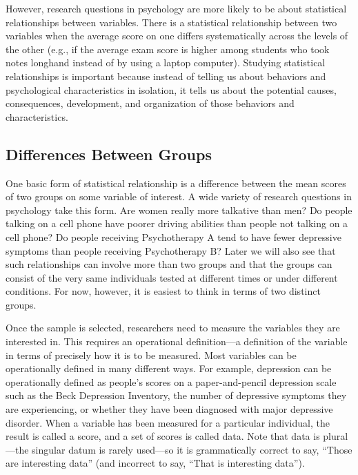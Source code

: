 \documentclass[]{book}
\theoremstyle{definition}
\theoremstyle{definition}
\theoremstyle{remark}
\begin{document}
However, research questions in psychology are more likely to be about
statistical relationships between variables. There is a statistical
relationship between two variables when the average score on one differs
systematically across the levels of the other (e.g., if the average exam
score is higher among students who took notes longhand instead of by
using a laptop computer). Studying statistical relationships is
important because instead of telling us about behaviors and
psychological characteristics in isolation, it tells us about the
potential causes, consequences, development, and organization of those
behaviors and characteristics.

\subsection{Differences Between
Groups}\label{differences-between-groups}

One basic form of statistical relationship is a difference between the
mean scores of two groups on some variable of interest. A wide variety
of research questions in psychology take this form. Are women really
more talkative than men? Do people talking on a cell phone have poorer
driving abilities than people not talking on a cell phone? Do people
receiving Psychotherapy A tend to have fewer depressive symptoms than
people receiving Psychotherapy B? Later we will also see that such
relationships can involve more than two groups and that the groups can
consist of the very same individuals tested at different times or under
different conditions. For now, however, it is easiest to think in terms
of two distinct groups.

Once the sample is selected, researchers need to measure the variables
they are interested in. This requires an operational definition---a
definition of the variable in terms of precisely how it is to be
measured. Most variables can be operationally defined in many different
ways. For example, depression can be operationally defined as people's
scores on a paper-and-pencil depression scale such as the Beck
Depression Inventory, the number of depressive symptoms they are
experiencing, or whether they have been diagnosed with major depressive
disorder. When a variable has been measured for a particular individual,
the result is called a score, and a set of scores is called data. Note
that data is plural---the singular datum is rarely used---so it is
grammatically correct to say, ``Those are interesting data'' (and
incorrect to say, ``That is interesting data'').
\end{document}
